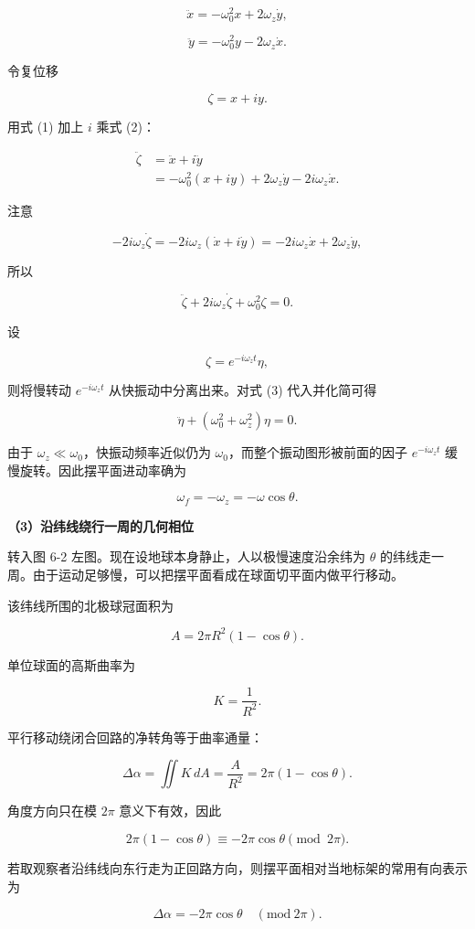 \documentclass[12pt,a4paper,UTF8]{ctexart}
\begin{document}
\[
\ddot x=-\omega_0^2x+2\omega_z\dot y, \tag{1}
\]

\[
\ddot y=-\omega_0^2y-2\omega_z\dot x. \tag{2}
\]

令复位移

\[
\zeta=x+iy.
\]

用式 (1) 加上 \(i\) 乘式 (2)：

\[
\begin{aligned}
\ddot\zeta
&=\ddot x+i\ddot y\\
&=-\omega_0^2(x+iy)
+2\omega_z\dot y-2i\omega_z\dot x.
\end{aligned}
\]

注意

\[
-2i\omega_z\dot\zeta
=-2i\omega_z(\dot x+i\dot y)
=-2i\omega_z\dot x+2\omega_z\dot y,
\]

所以

\[
\ddot\zeta+2i\omega_z\dot\zeta+\omega_0^2\zeta=0. \tag{3}
\]

设

\[
\zeta=e^{-i\omega_zt}\eta,
\]

则将慢转动 \(e^{-i\omega_zt}\) 从快振动中分离出来。对式 (3)
代入并化简可得

\[
\ddot\eta+(\omega_0^2+\omega_z^2)\eta=0.
\]

由于 \(\omega_z\ll\omega_0\)，快振动频率近似仍为
\(\omega_0\)，而整个振动图形被前面的因子 \(e^{-i\omega_zt}\)
缓慢旋转。因此摆平面进动率确为

\[
\omega_f=-\omega_z=-\omega\cos\theta.
\]

\textbf{（3）沿纬线绕行一周的几何相位}

转入图 6-2 左图。现在设地球本身静止，人以极慢速度沿余纬为 \(\theta\)
的纬线走一周。由于运动足够慢，可以把摆平面看成在球面切平面内做平行移动。

该纬线所围的北极球冠面积为

\[
A=2\pi R^2(1-\cos\theta).
\]

单位球面的高斯曲率为

\[
K=\frac1{R^2}.
\]

平行移动绕闭合回路的净转角等于曲率通量：

\[
\Delta\alpha
=\iint K\,dA
=\frac{A}{R^2}
=2\pi(1-\cos\theta).
\]

角度方向只在模 \(2\pi\) 意义下有效，因此

\[
2\pi(1-\cos\theta)
\equiv-2\pi\cos\theta\pmod{2\pi}.
\]

若取观察者沿纬线向东行走为正回路方向，则摆平面相对当地标架的常用有向表示为

\[
\boxed{\Delta\alpha=-2\pi\cos\theta\quad(\mathrm{mod}\ 2\pi)}.
\]
\end{document}
